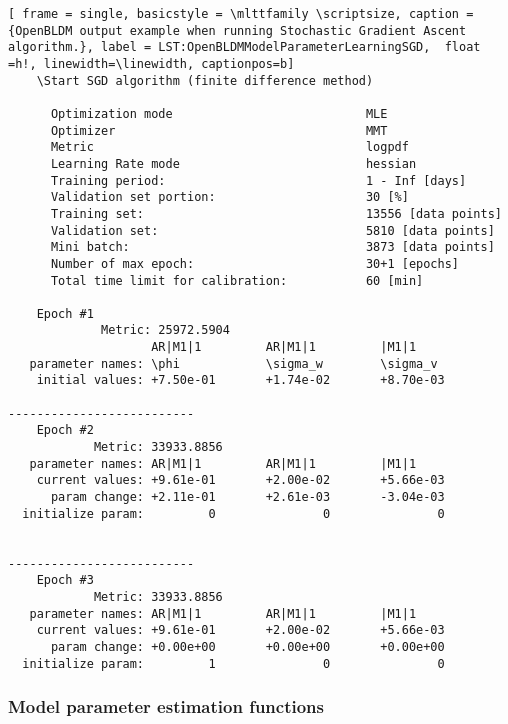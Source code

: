  \begin{lstlisting}[ frame = single, basicstyle = \mlttfamily \scriptsize, caption = {OpenBLDM output example when running Stochastic Gradient Ascent algorithm.}, label = LST:OpenBLDMModelParameterLearningSGD,  float =h!, linewidth=\linewidth, captionpos=b]
    \Start SGD algorithm (finite difference method)

      Optimization mode                           MLE
      Optimizer                                   MMT
      Metric                                      logpdf
      Learning Rate mode                          hessian
      Training period:                            1 - Inf [days]
      Validation set portion:                     30 [%]
      Training set:                               13556 [data points]
      Validation set:                             5810 [data points]
      Mini batch:                                 3873 [data points]
      Number of max epoch:                        30+1 [epochs]
      Total time limit for calibration:           60 [min]

    Epoch #1
             Metric: 25972.5904
                    AR|M1|1         AR|M1|1         |M1|1           
   parameter names: \phi            \sigma_w        \sigma_v        
    initial values: +7.50e-01       +1.74e-02       +8.70e-03       

--------------------------
    Epoch #2
            Metric: 33933.8856
   parameter names: AR|M1|1         AR|M1|1         |M1|1           
    current values: +9.61e-01       +2.00e-02       +5.66e-03      
      param change: +2.11e-01       +2.61e-03       -3.04e-03      
  initialize param:         0               0               0      


--------------------------
    Epoch #3
            Metric: 33933.8856
   parameter names: AR|M1|1         AR|M1|1         |M1|1           
    current values: +9.61e-01       +2.00e-02       +5.66e-03      
      param change: +0.00e+00       +0.00e+00       +0.00e+00      
  initialize param:         1               0               0 
\end{lstlisting}










\subsubsection{Model parameter estimation functions}

